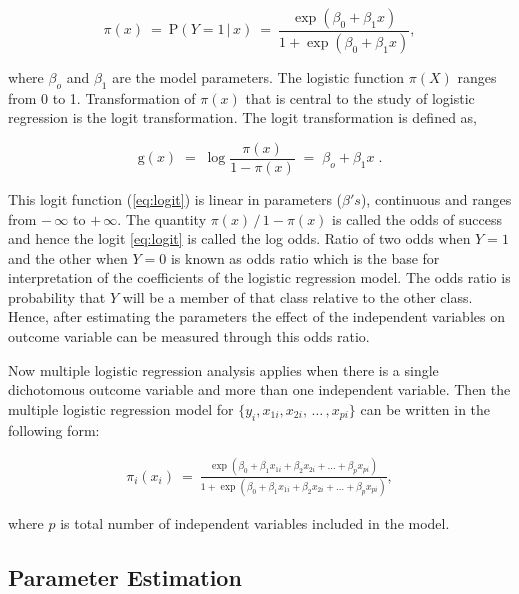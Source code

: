 \documentclass[
  12pt,
  oneside]{report}
\begin{document}
\begin{equation*}
\pi(x) \: = \: \mathrm{P}(Y = 1 \,| \, x) \: = \: \frac{\exp(\beta_0 + \beta_1x)}{1 + \exp(\beta_0 + \beta_1x)},
\end{equation*}

where \(\beta_o\) and \(\beta_1\) are the model parameters. The logistic function \(\pi(X)\) ranges from 0 to 1. Transformation of \(\pi(x)\) that is central to the study of logistic regression is the logit transformation. The logit transformation is
defined as,

\begin{equation}
\mathrm{g}(x) \; = \; \log\frac{\pi(x)}{1 - \pi(x)} \; = \; \beta_o + \beta_1x \; .
\label{eq:logit}
\end{equation}

This logit function (\eqref{eq:logit}) is linear in parameters (\(\beta's\)), continuous and ranges from \(- \, \infty\) to \(+\, \infty\). The quantity \(\pi(x)\,/\,1 - \pi(x)\) is called the odds of success and hence the logit \eqref{eq:logit} is called the log
odds. Ratio of two odds when \(Y = 1\) and the other when \(Y = 0\) is known as odds ratio which is the base for interpretation of the coefficients of the logistic regression model. The odds ratio is probability that \(Y\) will be a member of that class relative to the other class. Hence, after estimating the parameters the effect of the independent variables on outcome variable can be measured through this odds ratio.

Now multiple logistic regression analysis applies when there is a single
dichotomous outcome variable and more than one independent variable. Then the multiple logistic regression model for \(\{y_i, x_{1i}, x_{2i}, \, \dots \, , x_{pi}\}\) can be written in the following form:

\begin{align*}
\pi_i(x_i) \: = \: \frac{\exp(\beta_{0} + \beta_1x_{1i} + \beta_2x_{2i} + \dots + \beta_px_{pi} )}{1 + \exp(\beta_{0} + \beta_1x_{1i} + \beta_2x_{2i} + \dots + \beta_px_{pi} )},
\end{align*}

where \(p\) is total number of independent variables included in the model.

\hypertarget{parameter-estimation}{%
\subsection{Parameter Estimation}\label{parameter-estimation}}
\end{document}
